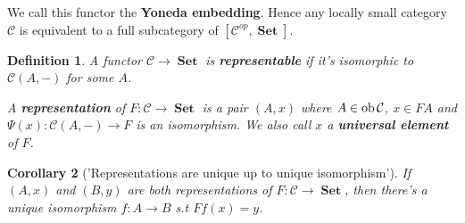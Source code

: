 \documentclass[a4paper]{article}
\newtheorem{definition}{Definition}
\newtheorem{corollary}[definition]{Corollary}
\numberwithin{definition}{section}
\newcommand*\ob[1]{\textnormal{ob}\,#1}
\DeclareMathOperator{\Set}{\textbf{Set}}
\begin{document}
We call this functor the \textbf{Yoneda embedding}. Hence any locally small category $\mathcal{C}$ is equivalent to a full subcategory of $[\mathcal{C}^{op}, \Set]$.

\begin{definition}
	A functor $\mathcal{C} \to \Set$ is \textbf{representable} if it's isomorphic to $\mathcal{C}(A, -)$ for some $A$.
	
	A \textbf{representation} of $F: \mathcal{C} \to \Set$ is a pair $(A, x)$ where $A \in \ob \mathcal{C}$, $x \in FA$ and $\Psi(x): \mathcal{C}(A, -) \to F$ is an isomorphism. We also call $x$ a \textbf{universal element} of $F$.
\end{definition}

\begin{corollary}['Representations are unique up to unique isomorphism']
	If $(A, x)$ and $(B, y)$ are both representations of $F: \mathcal{C} \to \Set$, then there's a unique isomorphism $f: A \to B$ s.t $Ff(x)=y$.
\end{corollary}
\end{document}
